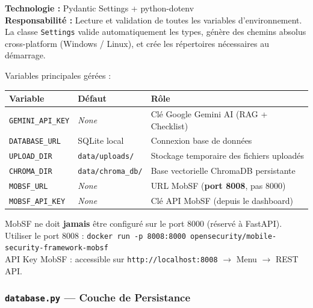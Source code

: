 \documentclass[12pt,a4paper,french]{article}
\newcommand{\file}[1]{\textcolor{primary}{\texttt{#1}}}
\begin{document}
\begin{tcolorbox}[toolbox, title={Rôle : Centralisation de la Configuration}]
\textbf{Technologie :} Pydantic Settings + python-dotenv\\
\textbf{Responsabilité :} Lecture et validation de toutes les variables d'environnement.
La classe \texttt{Settings} valide automatiquement les types, génère des chemins absolus
cross-platform (Windows / Linux), et crée les répertoires nécessaires au démarrage.
\end{tcolorbox}

Variables principales gérées :

\begin{center}
\renewcommand{\arraystretch}{1.3}
\begin{tabular}{llp{6cm}}
\toprule
\textbf{Variable} & \textbf{Défaut} & \textbf{Rôle} \\
\midrule
\rowcolor{primary!5}
\texttt{GEMINI\_API\_KEY} & \textit{None} & Clé Google Gemini AI (RAG + Checklist) \\
\texttt{DATABASE\_URL} & SQLite local & Connexion base de données \\
\rowcolor{primary!5}
\texttt{UPLOAD\_DIR} & \texttt{data/uploads/} & Stockage temporaire des fichiers uploadés \\
\texttt{CHROMA\_DIR} & \texttt{data/chroma\_db/} & Base vectorielle ChromaDB persistante \\
\rowcolor{primary!5}
\texttt{MOBSF\_URL} & \textit{None} & URL MobSF (\textbf{port 8008}, pas 8000) \\
\texttt{MOBSF\_API\_KEY} & \textit{None} & Clé API MobSF (depuis le dashboard) \\
\bottomrule
\end{tabular}
\end{center}

\begin{tcolorbox}[warnbox, title={Attention — Conflit de ports MobSF}]
MobSF ne doit \textbf{jamais} être configuré sur le port 8000 (réservé à FastAPI).
Utiliser le port 8008 : \texttt{docker run -p 8008:8000 opensecurity/mobile-security-framework-mobsf}\\
API Key MobSF : accessible sur \texttt{http://localhost:8008} $\rightarrow$ Menu $\rightarrow$ REST API.
\end{tcolorbox}

\subsubsection{\file{database.py} — Couche de Persistance}
\end{document}
